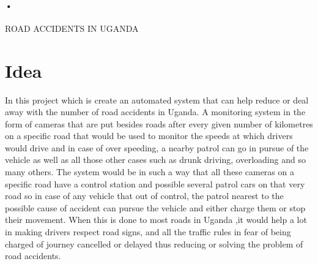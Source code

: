 \documentclass[12pt]{article}
\begin{document}
\paragraph{•}
\centerline{ROAD ACCIDENTS IN UGANDA}
\section{Idea}
In this project which is create an automated system that can help reduce or deal away with the number of road accidents in Uganda. A monitoring system in the form of cameras that are put besides roads after every given number of kilometres on a specific road that would be used to monitor the speeds at which drivers would drive and in case of over speeding, a nearby patrol can go in pursue of the vehicle as well as all those other cases such as drunk driving, overloading and so many others. The system would be in such a way that all these cameras on a specific road have a control station and possible several patrol cars on that very road so in case of any vehicle that out of control, the patrol nearest to the possible cause of accident can pursue the vehicle and either charge them or stop their movement. When this is done to most roads in Uganda ,it would help a lot in making drivers respect road signs, and all the traffic rules in fear of being charged of journey cancelled or delayed thus reducing or solving the problem of road accidents.
\end{document}
